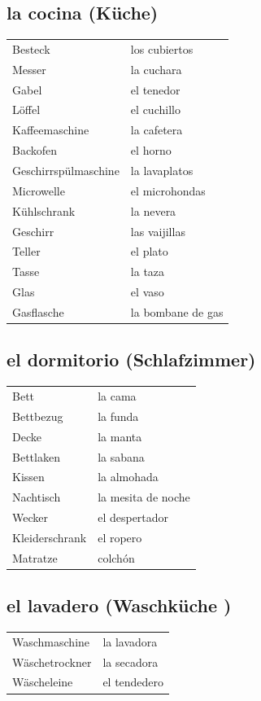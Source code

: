\documentclass{spanish_summary}
\begin{document}
\subsection*{la cocina (Küche)}
\begin{longtable}{p{} p{}} 
  Besteck & los cubiertos \\
  Messer & la cuchara \\
  Gabel & el tenedor \\
  Löffel & el cuchillo \\
  Kaffeemaschine &  la cafetera \\
  Backofen & el horno \\
  Geschirrspülmaschine & la lavaplatos \\ 
  Microwelle &  el microhondas \\
  Kühlschrank & la nevera \\
  Geschirr & las vaijillas \\
  Teller & el plato \\
  Tasse & la taza \\
  Glas & el vaso \\
  Gasflasche & la bombane de gas \\
\end{longtable}
\newpage
\subsection*{el dormitorio (Schlafzimmer)}
\begin{longtable}{p{} p{}} 
  Bett & la cama \\
  Bettbezug & la funda \\
  Decke & la manta \\
  Bettlaken & la sabana \\
  Kissen & la almohada \\
  Nachtisch & la mesita de noche \\
  Wecker & el despertador \\
  Kleiderschrank & el ropero \\
  Matratze & colchón \\
\end{longtable}

\subsection*{el lavadero (Waschküche )}
\begin{longtable}{p{} p{}} 
  Waschmaschine & la lavadora\\
  Wäschetrockner & la secadora\\
  Wäscheleine & el tendedero \\
\end{longtable}
\end{document}
